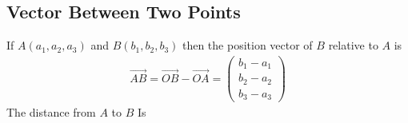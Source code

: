 \documentclass[10pt, a4paper, titlepage]{article}
\begin{document}
\begin{multicols*}{3}
	\dotfill
	\subsection{Vector Between Two Points}
	If $A(a_1,a_2,a_3)$ and $B(b_1,b_2,b_3)$ then the position vector of $B$ relative to $A$ is 
	\begin{align}
		\overrightarrow{AB}=\overrightarrow{OB}-\overrightarrow{OA}=\begin{pmatrix}b_1-a_1\\ b_2-a_2 \\b_3-a_3\end{pmatrix}
	\end{align}
	The distance from $A$ to $B$ Is
	\\

	\hrulefill







\end{multicols*}
\end{document}

